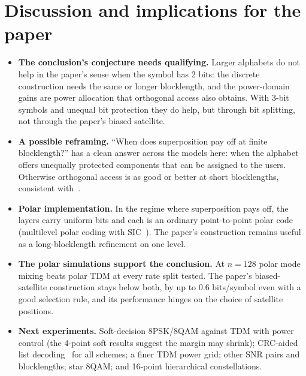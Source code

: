 \documentclass[11pt]{article}
\begin{document}
\section{Discussion and implications for the paper}
\begin{itemize}
\item \textbf{The conclusion's conjecture needs qualifying.} Larger alphabets do not help in the paper's sense when the symbol has 2 bits: the discrete construction needs the same or longer blocklength, and the power-domain gains are power allocation that orthogonal access also obtains. With 3-bit symbols and unequal bit protection they do help, but through bit splitting, not through the paper's biased satellite.
\item \textbf{A possible reframing.} ``When does superposition pay off at finite blocklength?'' has a clean answer across the models here: when the alphabet offers unequally protected components that can be assigned to the users. Otherwise orthogonal access is as good or better at short blocklengths, consistent with~\cite{gorce2021noma}.
\item \textbf{Polar implementation.} In the regime where superposition pays off, the layers carry uniform bits and each is an ordinary point-to-point polar code (multilevel polar coding with SIC~\cite{seidl2013pcm}). The paper's construction remains useful as a long-blocklength refinement on one level.
\item \textbf{The polar simulations support the conclusion.} At $n=128$ polar mode mixing beats polar TDM at every rate split tested. The paper's biased-satellite construction stays below both, by up to $0.6$ bits/symbol even with a good selection rule, and its performance hinges on the choice of satellite positions.
\item \textbf{Next experiments.} Soft-decision 8PSK/8QAM against TDM with power control (the 4-point soft results suggest the margin may shrink); CRC-aided list decoding~\cite{talvardy2015list} for all schemes; a finer TDM power grid; other SNR pairs and blocklengths; star 8QAM; and 16-point hierarchical constellations.
\end{itemize}
\end{document}
